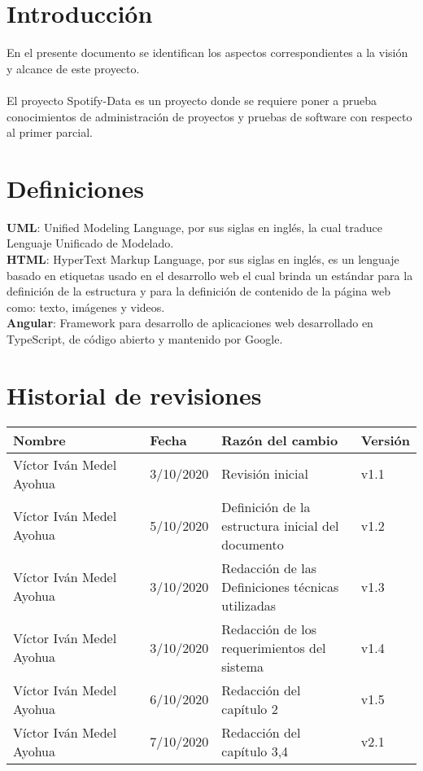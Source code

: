 \documentclass[12pt,a4paper]{book}
\date{\today}
\begin{document}
 	

\tableofcontents
\newpage

\section{Introducción}
\vspace{0.5 cm}
En el presente documento se identifican los aspectos correspondientes a la visión y alcance de este proyecto.\\
\\ El proyecto Spotify-Data es un proyecto donde se requiere poner a prueba conocimientos de administración de proyectos y pruebas de software con respecto al primer parcial.
		
\section{Definiciones}
\vspace{0.5 cm}
\textbf {UML}: Unified Modeling Language, por sus siglas en inglés, la cual traduce
Lenguaje Unificado de Modelado.\\

\textbf {HTML}: HyperText Markup Language, por sus siglas en inglés, es un lenguaje
basado en etiquetas usado en el desarrollo web el cual brinda un estándar para
la definición de la estructura y para la definición de contenido de la página web
como: texto, imágenes y videos.\\

\textbf {Angular}: Framework para desarrollo de aplicaciones web desarrollado en TypeScript, de código abierto y mantenido por Google.\\

\section{Historial de revisiones}
\vspace{0.5 cm}
\begin{table}[h!]
\centering
\begin{tabular}{|p{0.35\linewidth}|p{0.15\linewidth}|p{0.35\linewidth}|p{0.15\linewidth}|}
\hline
\textbf{Nombre}&\textbf{Fecha}&\textbf{Razón del cambio}&\textbf{Versión}
\\\hline
Víctor Iván Medel Ayohua&3/10/2020&Revisión inicial&v1.1\\\hline
Víctor Iván Medel Ayohua&5/10/2020&Definición de la estructura inicial del documento&v1.2\\\hline
Víctor Iván Medel Ayohua&3/10/2020&Redacción de las Definiciones técnicas utilizadas&v1.3\\\hline
Víctor Iván Medel Ayohua&3/10/2020&Redacción de los requerimientos del sistema&v1.4\\\hline
Víctor Iván Medel Ayohua&6/10/2020&Redacción del capítulo 2&v1.5\\\hline
Víctor Iván Medel Ayohua&7/10/2020&Redacción del capítulo 3,4 &v2.1\\\hline
\end{tabular}
\end{table}
\end{document}
